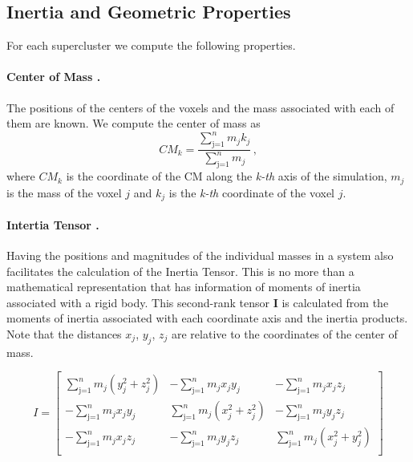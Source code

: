 \subsection{Inertia and Geometric Properties}
\label{sec:IN}
For each supercluster we compute the following properties.
\paragraph{Center of Mass .} 
The positions of the centers of the voxels and the mass associated with each of them are known. We compute the center of mass as 
\begin{equation}
    CM_k = \frac{\sum\limits^{n}_{\text{j=1}} m_j k_j}{\sum\limits^{n}_{\text{j=1}} m_j} \,,
\end{equation}
where $CM_k$ is the coordinate of the CM along the \emph{k-th} axis of the simulation, $m_j$ is the mass of the voxel $j$ and $k_j$ is the \emph{k-th} coordinate of the voxel $j$. 


\paragraph{Intertia Tensor .}
Having the positions and magnitudes of the individual masses in a system also facilitates the calculation of the Inertia Tensor. This is no more than a mathematical representation that has information of moments of inertia associated with a rigid body. This second-rank tensor \textbf{I} is calculated from the moments of inertia associated with each coordinate axis and the inertia products. Note that  the distances $x_j$, $y_j$, $z_j$ are relative to the coordinates of the center of mass.

\[
  I=
  \left[ {\begin{array}{ccc}
   \sum\limits^{n}_{\text{j=1}} m_j (y_j^2 + z_j^2) & -\sum\limits^{n}_{\text{j=1}} m_j x_j y_j & -\sum\limits^{n}_{\text{j=1}} m_j x_j z_j  \\
   -\sum\limits^{n}_{\text{j=1}} m_j x_j y_j & \sum\limits^{n}_{\text{j=1}} m_j (x_j^2 + z_j^2) & -\sum\limits^{n}_{\text{j=1}} m_j y_j z_j  \\
   -\sum\limits^{n}_{\text{j=1}} m_j x_j z_j & -\sum\limits^{n}_{\text{j=1}} m_j y_j z_j & \sum\limits^{n}_{\text{j=1}} m_j (x_j^2 + y_j^2)  \\
  \end{array} } \right]
\]




